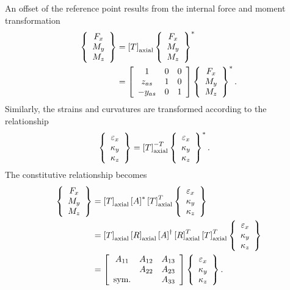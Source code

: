 An offset of the reference point results from the internal force
and moment transformation
\begin{align}
	\cubr{\cvvect{
		F_x \\
		M_y \\
		M_z \\
	}}
	&= \sqbr{T}_{\text{axial}} \cubr{\cvvect{
		F_x \\
		M_y \\
		M_z \\
	}}^*
	\nonumber \\
	&=
	\sqbr{\matr{ccc}{
		1 & 0 & 0 \\
		z_{as} & 1 & 0 \\
		-y_{as} & 0 & 1
	}}
	\cubr{\cvvect{
		F_x \\
		M_y \\
		M_z \\
	}}^*
	.
\end{align}
Similarly,
the strains and curvatures are transformed according to the relationship
\begin{align}
	\cubr{\cvvect{
		\varepsilon_x \\
		\kappa_y \\
		\kappa_z \\
	}}
	&=
	\sqbr{T}_{\text{axial}}^{-T}
	\cubr{\cvvect{
		\varepsilon_x \\
		\kappa_y \\
		\kappa_z \\
	}}^*
	.
\end{align}
The constitutive relationship becomes
\begin{align}
	\cubr{\cvvect{
		F_x \\
		M_y \\
		M_z \\
	}}
	&=
	\sqbr{T}_{\text{axial}} \sqbr{A}^* \sqbr{T}_{\text{axial}}^T
	\cubr{\cvvect{
		\varepsilon_x \\
		\kappa_y \\
		\kappa_z \\
	}}
	\nonumber \\
	&= \sqbr{T}_{\text{axial}} \sqbr{R}_{\text{axial}}
		\sqbr{A}^{\dagger}
		\sqbr{R}_{\text{axial}}^T \sqbr{T}_{\text{axial}}^T
	\cubr{\cvvect{
		\varepsilon_x \\
		\kappa_y \\
		\kappa_z \\
	}}
	\nonumber \\
	&=
	\sqbr{\matr{ccc}{
		A_{11} & A_{12} & A_{13} \\
		& A_{22} & A_{23} \\
		\text{sym.} & & A_{33}
	}}
	\cubr{\cvvect{
		\varepsilon_x \\
		\kappa_y \\
		\kappa_z \\
	}}
	.
\end{align}
